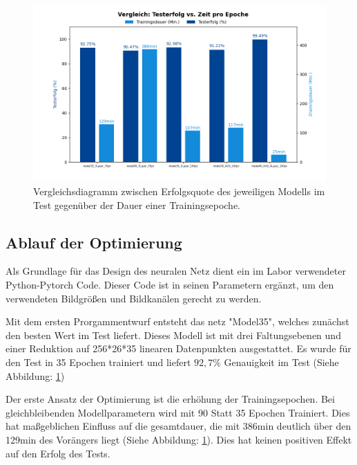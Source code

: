 \documentclass[journal,twoside,web]{ieeecolor}
\begin{document}
\begin{figure}[H]
    \centerline{\includegraphics[width=\columnwidth]{Erfolg_Dauer.png}}
    \caption{Vergleichsdiagramm zwischen Erfolgsquote des jeweiligen Modells im Test gegenüber der Dauer einer Trainingsepoche.}
    \label{fig:compareGraph}
\end{figure}

\subsection{Ablauf der Optimierung}
\label{sec:optimization}
Als Grundlage für das Design des neuralen Netz dient ein im Labor verwendeter Python-Pytorch Code. Dieser Code ist in seinen Parametern ergänzt, um den verwendeten Bildgrößen und Bildkanälen gerecht zu werden. 

Mit dem ersten Prorgammentwurf entsteht das netz "Model35", welches zunächst den besten Wert im Test liefert. Dieses Modell ist mit drei Faltungsebenen und einer Reduktion auf 256*26*35 linearen Datenpunkten ausgestattet.
Es wurde für den Test in 35 Epochen trainiert und liefert $92,7\%$ Genauigkeit im Test (Siehe Abbildung: \ref{fig:compareGraph})

Der erste Ansatz der Optimierung ist die erhöhung der Trainingsepochen. Bei gleichbleibenden Modellparametern wird mit 90 Statt 35 Epochen Trainiert.
Dies hat maßgeblichen Einfluss auf die gesamtdauer, die mit 386min deutlich über den 129min des Vorängers liegt (Siehe Abbildung: \ref{fig:compareGraph}). Dies hat keinen positiven Effekt auf den Erfolg des Tests.
\end{document}
